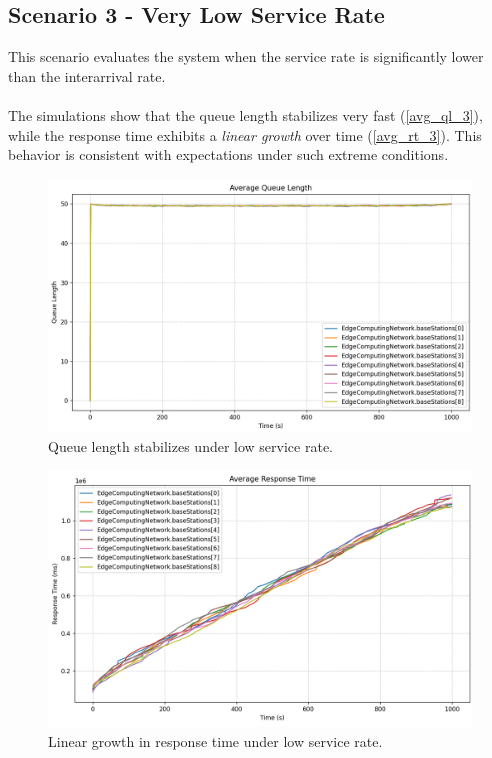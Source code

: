\documentclass{report}
\begin{document}
\subsection{Scenario 3 - Very Low Service Rate}
This scenario evaluates the system when the service rate is significantly lower than the interarrival rate. \\\\
The simulations show that the queue length stabilizes very fast (\autoref{avg_ql_3}), while the response time exhibits a \textit{linear growth} over time (\autoref{avg_rt_3}). This behavior is consistent with expectations under such extreme conditions.

\begin{figure}[H]
    \centering
    \includegraphics[width=1\textwidth]{img/avg_ql_3.png}
    \caption{Queue length stabilizes under low service rate.}
    \label{avg_ql_3}
\end{figure}

\begin{figure}[H]
    \centering
    \includegraphics[width=1\textwidth]{img/avg_rt_3.png}
    \caption{Linear growth in response time under low service rate.}
    \label{avg_rt_3}
\end{figure}
\end{document}
